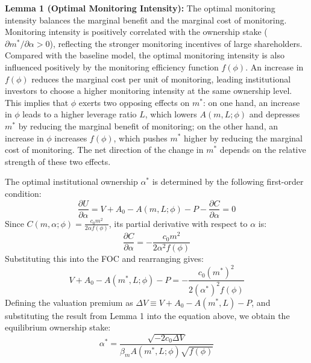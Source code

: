 \documentclass[12pt,a4paper]{article}
\begin{document}
\textbf{Lemma 1 (Optimal Monitoring Intensity):} The optimal monitoring intensity balances the marginal benefit and the marginal cost of monitoring. Monitoring intensity is positively correlated with the ownership stake ($\partial m^* / \partial \alpha > 0$), reflecting the stronger monitoring incentives of large shareholders. Compared with the baseline model, the optimal monitoring intensity is also influenced positively by the monitoring efficiency function $f(\phi)$. An increase in $f(\phi)$ reduces the marginal cost per unit of monitoring, leading institutional investors to choose a higher monitoring intensity at the same ownership level. This implies that $\phi$ exerts two opposing effects on $m^*$: on one hand, an increase in $\phi$ leads to a higher leverage ratio $L$, which lowers $A(m, L; \phi)$ and depresses $m^*$ by reducing the marginal benefit of monitoring; on the other hand, an increase in $\phi$ increases $f(\phi)$, which pushes $m^*$ higher by reducing the marginal cost of monitoring. The net direction of the change in $m^*$ depends on the relative strength of these two effects. 

The optimal institutional ownership $\alpha^*$ is determined by the following first-order condition:
\begin{equation}
\frac{\partial U}{\partial \alpha} = V + A_0 - A(m, L; \phi) - P - \frac{\partial C}{\partial \alpha} = 0
\end{equation}
Since $C(m, \alpha; \phi) = \frac{c_0 m^2}{2 \alpha f(\phi)}$, its partial derivative with respect to $\alpha$ is:
\begin{equation}
\frac{\partial C}{\partial \alpha} = -\frac{c_0 m^2}{2 \alpha^2 f(\phi)}
\end{equation}
Substituting this into the FOC and rearranging gives:
\begin{equation}
V + A_0 - A(m^*, L; \phi) - P = -\frac{c_0(m^*)^2}{2(\alpha^*)^2 f(\phi)}
\end{equation}
Defining the valuation premium as $\Delta V \equiv V + A_0 - A(m^*, L) - P$, and substituting the result from Lemma 1 into the equation above, we obtain the equilibrium ownership stake:
\begin{equation}
\alpha^* = \frac{\sqrt{-2c_0 \Delta V}}{\beta_m A(m^*, L; \phi) \sqrt{f(\phi)}}
\end{equation}
\end{document}
